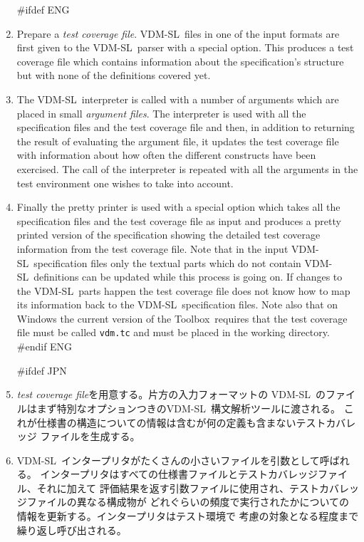 \documentclass[\pformat,12pt]{article}
\newcommand{\vdmslpp}{VDM-SL}
\newcommand{\Toolbox}{Toolbox}
\newcommand{\vdmslpp}{VDM++}
\newcommand{\Toolbox}{Toolbox}
\begin{document}
\begin{enumerate}

#ifdef ENG
\item Prepare a {\em test coverage file}.
  \vdmslpp\ files in one of the input formats are first given to the
  \vdmslpp\ parser with a special option. This produces a test
  coverage file which contains information about the specification's
  structure but with none of the  definitions covered yet.

\item The \vdmslpp\ interpreter is called with a number of arguments
   which are placed in small {\em argument files\/}. The interpreter is used
  with all the specification files and the test coverage file and
  then, in addition to returning the result of evaluating the argument
  file, it updates the test coverage file with information about how
  often the different constructs have been exercised. The call of the
  interpreter is repeated with all the arguments in the test
  environment one wishes to take into account.
  
\item Finally the pretty printer is used with a special option which
  takes all the specification files and the test coverage file as
  input and 
  produces a pretty printed version of the specification showing the
  detailed test coverage information from the test coverage file.
  Note that in the input \vdmslpp\ specification files only the
  textual parts which do not contain \vdmslpp\ definitions can be
  updated while this process is going on. If changes to the \vdmslpp\ 
  parts happen the test coverage file does not know how to map its
  information back to the \vdmslpp\ specification files. Note also that on
  Windows the current version of the \Toolbox\ requires that the test
  coverage file must be called \texttt{vdm.tc} and must be
  placed in the working directory.
#endif ENG

#ifdef JPN
\item
  {\em test coverage file}を用意する。片方の入力フォーマットの
  \vdmslpp\ のファイルはまず特別なオプションつきの\vdmslpp\ 構文解析ツールに渡される。
  これが仕様書の構造についての情報は含むが何の定義も含まないテストカバレッジ
  ファイルを生成する。

\item
  \vdmslpp\ インタープリタがたくさんの小さいファイルを引数として呼ばれる。
  インタープリタはすべての仕様書ファイルとテストカバレッジファイル、それに加えて
  評価結果を返す引数ファイルに使用され、テストカバレッジファイルの異なる構成物が
  どれぐらいの頻度で実行されたかについての情報を更新する。インタープリタはテスト環境で
  考慮の対象となる程度まで繰り返し呼び出される。
  

\end{enumerate}
\end{document}
